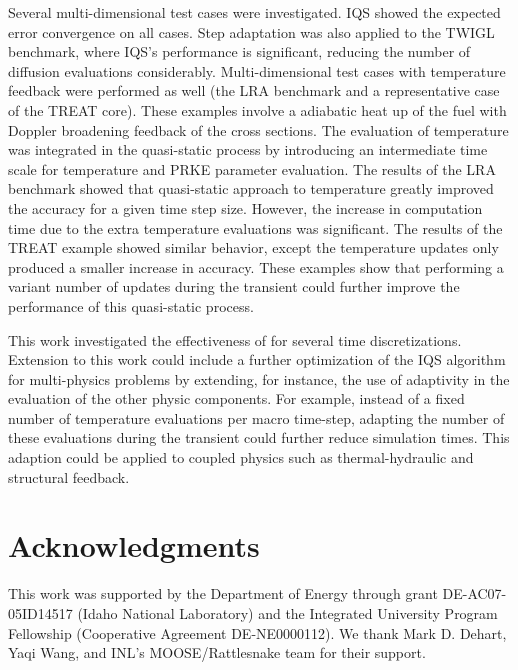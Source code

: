 \documentclass{elsarticle}
\begin{document}
Several multi-dimensional test cases were investigated. IQS showed the expected error convergence on all cases. Step adaptation was also applied to the TWIGL benchmark, where IQS's performance is significant, reducing the number of diffusion evaluations considerably. 
Multi-dimensional test cases with temperature feedback were performed as well (the LRA benchmark and a representative case of the TREAT core). 
These examples involve a adiabatic heat up of the fuel with Doppler broadening feedback of the cross sections. The evaluation of temperature was integrated in the quasi-static process by introducing an intermediate time scale for temperature and PRKE parameter evaluation. The results of the LRA benchmark showed that quasi-static approach to temperature greatly improved the accuracy for a given time step size. However, the increase in computation time due to the extra temperature evaluations was significant. The results of the TREAT example showed similar behavior, except the temperature updates only produced a smaller increase in accuracy. These examples show that performing a variant number of updates during the transient could further improve the performance of this quasi-static process. 

This work investigated the effectiveness of for several time discretizations. Extension to this work could include a further optimization of the IQS algorithm for multi-physics problems by extending, for instance,  the use of adaptivity in the evaluation of the other physic components. For example, instead of a fixed number of temperature evaluations per macro time-step, adapting the number of these evaluations during the transient could further reduce simulation times. This adaption could be applied to coupled physics such as thermal-hydraulic and structural feedback.


\section{Acknowledgments}
This work was supported by the Department of Energy through grant DE-AC07-05ID14517 (Idaho National Laboratory) and the Integrated University Program Fellowship (Cooperative Agreement DE-NE0000112).  We thank Mark D. Dehart, Yaqi Wang, and INL's MOOSE/Rattlesnake team for their support. 





\end{document}
